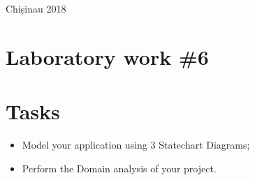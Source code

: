 \documentclass[12pt,a4paper,titlepage]{article}
\begin{document}
\begin{titlepage}
\begin{center}
      \vspace{5 mm}


      {\large Chișinau 2018}\\[3cm] %




      \vfill %
      \end{center}
      
\end{titlepage}

\cleardoublepage

\newpage

\setcounter{page}{1}
\setcounter{secnumdepth}{4}

\cleardoublepage


{}
\section*{Laboratory work \#6}

\section{Tasks}
\begin{itemize}
	\item
	Model your application using 3 Statechart Diagrams;
	\item 
	Perform the Domain analysis of your project.
\end{itemize}
\end{document}
